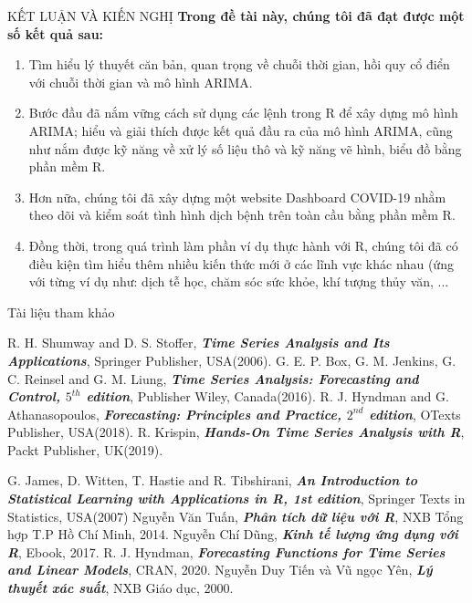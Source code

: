 \documentclass[notheorems,envcountsect,hyperref=unicode]{beamer}
\begin{document}
\begin{frame}{KẾT LUẬN VÀ KIẾN NGHỊ} 
\textbf{Trong đề tài này, chúng tôi đã đạt được một số kết quả sau:} 
\begin{enumerate}
\item Tìm hiểu lý thuyết căn bản, quan trọng về chuỗi thời gian, hồi quy cổ điển với chuỗi thời gian và mô hình ARIMA.
\item Bước đầu đã nắm vững cách sử dụng các lệnh trong R để xây dựng mô hình ARIMA; hiểu và giải thích được kết quả đầu ra của mô hình ARIMA, cũng như nắm được kỹ năng về xử lý số liệu thô và kỹ năng vẽ hình, biểu đồ bằng phần mềm R.
\item Hơn nữa, chúng tôi đã xây dựng một website Dashboard COVID-19 nhằm theo dõi và kiểm soát tình hình dịch bệnh trên toàn cầu bằng phần mềm R.
\item Đồng thời, trong quá trình làm phần ví dụ thực hành với R, chúng tôi đã có điều kiện tìm hiểu thêm nhiều kiến thức mới ở các lĩnh vực khác nhau (ứng với từng ví dụ như: dịch tễ học, chăm sóc sức khỏe, khí tượng thủy văn, ...
\end{enumerate}
\end{frame}

\begin{frame}{Tài liệu tham khảo}
\begin{thebibliography}{99}
	 R. H. Shumway and D. S. Stoffer, \textbf{\textit{Time Series Analysis and Its Applications}}, Springer Publisher, USA(2006).
	 G. E. P. Box, G. M. Jenkins, G. C. Reinsel and G. M. Liung, \textbf{\textit{Time Series Analysis: Forecasting and Control, $5^{th}$ edition}}, Publisher Wiley, Canada(2016).
	 R. J. Hyndman and G. Athanasopoulos, \textbf{\textit{Forecasting: Principles and Practice, $2^{nd}$ edition}}, OTexts Publisher, USA(2018).
	 R. Krispin,  \textbf{\textit{Hands-On Time Series Analysis with R}}, Packt Publisher, UK(2019). 
\end{thebibliography}	
\end{frame}

\begin{frame}
\begin{thebibliography}{99}	
	 G. James, D. Witten, T. Hastie and R. Tibshirani, \textbf{\textit{An Introduction to Statistical Learning with Applications in R, 1st edition}}, Springer Texts in Statistics, USA(2007)
	 Nguyễn Văn Tuấn,  \textbf{\textit{Phân tích dữ liệu với R}}, NXB Tổng hợp T.P Hồ Chí Minh, 2014.
	 Nguyễn Chí Dũng, \textbf{\textit{Kinh tế lượng ứng dụng với R}}, Ebook, 2017.
	 R. J. Hyndman, \textbf{\textit{Forecasting Functions for Time Series and Linear Models}}, CRAN, 2020.
	 Nguyễn Duy Tiến và Vũ ngọc Yên, \textbf{\textit{Lý thuyết xác suất}}, NXB Giáo dục, 2000.
\end{thebibliography}	
\end{frame}
\end{document}
